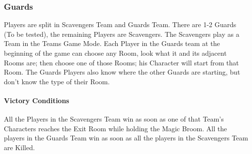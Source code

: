\subsubsection{Guards}
Players are split in Scavengers Team and Guards Team. There are 1-2 Guards (To be tested), the remaining Players are Scavengers.
The Scavengers play as a Team in the Teams Game Mode.
Each Player in the Guards team at the beginning of the game can choose any Room, look what it and its adjacent Rooms are; then choose one of those Rooms; his Character will start from that Room. The Guards Players also know where the other Guards are starting, but don't know the type of their Room.
\paragraph{Victory Conditions} All the Players in the Scavengers Team win as soon as one of that Team's Characters reaches the Exit Room while holding the Magic Broom. All the players in the Guards Team win as soon as all the players in the Scavengers Team are Killed.

